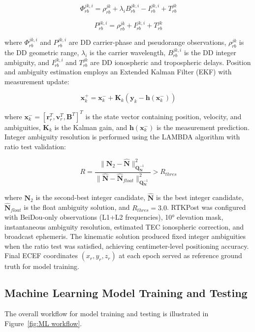 \documentclass{isprs} %
\begin{document}
\begin{equation}
\Phi_{rb}^{jk,i} = \rho_{rb}^{jk} + \lambda_i B_{rb}^{jk,i} - I_{rb}^{jk,i} + T_{rb}^{jk}
\end{equation}

\begin{equation}
P_{rb}^{jk,i} = \rho_{rb}^{jk} + I_{rb}^{jk,i} + T_{rb}^{jk}
\end{equation}

where \(\Phi_{rb}^{jk,i}\) and \(P_{rb}^{jk,i}\) are DD carrier-phase and pseudorange observations, \(\rho_{rb}^{jk}\) is the DD geometric range, \(\lambda_i\) is the carrier wavelength, \(B_{rb}^{jk,i}\) is the DD integer ambiguity, and \(I_{rb}^{jk,i}\) and \(T_{rb}^{jk}\) are DD ionospheric and tropospheric delays. Position and ambiguity estimation employs an Extended Kalman Filter (EKF) with measurement update:

\begin{equation}
\mathbf{x}_k^+ = \mathbf{x}_k^- + \mathbf{K}_k(\mathbf{y}_k - \mathbf{h}(\mathbf{x}_k^-))
\end{equation}

where \(\mathbf{x}_k^- = [\mathbf{r}_r^T, \mathbf{v}_r^T, \mathbf{B}^T]^T\) is the state vector containing position, velocity, and ambiguities, \(\mathbf{K}_k\) is the Kalman gain, and \(\mathbf{h}(\mathbf{x}_k^-)\) is the measurement prediction. Integer ambiguity resolution is performed using the LAMBDA algorithm with ratio test validation:

\begin{equation}
R = \frac{\|\mathbf{N}_2 - \hat{\mathbf{N}}\|_{\mathbf{Q}_{\mathbf{N}}^{-1}}^2}{\|\hat{\mathbf{N}} - \hat{\mathbf{N}}_{float}\|_{\mathbf{Q}_{\mathbf{N}}^{-1}}^2} > R_{thres}
\end{equation}

where \(\mathbf{N}_2\) is the second-best integer candidate, \(\hat{\mathbf{N}}\) is the best integer candidate, \(\hat{\mathbf{N}}_{float}\) is the float ambiguity solution, and \(R_{thres} = 3.0\). RTKPost was configured with BeiDou-only observations (L1+L2 frequencies), 10° elevation mask, instantaneous ambiguity resolution, estimated TEC ionospheric correction, and broadcast ephemeris. The kinematic solution produced fixed integer ambiguities when the ratio test was satisfied, achieving centimeter-level positioning accuracy. Final ECEF coordinates \((x_r, y_r, z_r)\) at each epoch served as reference ground truth for model training.


\subsection{Machine Learning Model Training and Testing}
The overall workflow for model training and testing is illustrated in Figure~\ref{fig:ML workflow}.
\end{document}
